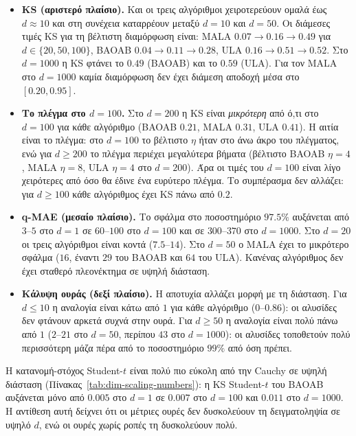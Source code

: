 \begin{itemize}
\item \textbf{KS (αριστερό πλαίσιο).} Και οι τρεις αλγόριθμοι χειροτερεύουν
      ομαλά έως $d \approx 10$ και στη συνέχεια καταρρέουν μεταξύ $d = 10$ και
      $d = 50$. Οι διάμεσες τιμές KS για τη βέλτιστη διαμόρφωση είναι:
      MALA $0.07 \to 0.16 \to 0.49$ για $d \in \{20, 50, 100\}$,
      BAOAB $0.04 \to 0.11 \to 0.28$, ULA $0.16 \to 0.51 \to 0.52$. Στο
      $d=1000$ η KS φτάνει το $0.49$ (BAOAB) και το $0.59$ (ULA). Για τον MALA στο
      $d=1000$ καμία διαμόρφωση δεν έχει διάμεση αποδοχή μέσα στο
      $[0.20, 0.95]$.
\item \textbf{Το πλέγμα στο $d=100$.} Στο $d=200$ η KS είναι \emph{μικρότερη}
      από ό,τι στο $d=100$ για κάθε αλγόριθμο (BAOAB $0.21$, MALA $0.31$, ULA
      $0.41$). Η αιτία είναι το πλέγμα: στο $d=100$ το βέλτιστο $\eta$ ήταν στο
      άνω άκρο του πλέγματος, ενώ για $d \ge 200$ το πλέγμα περιέχει μεγαλύτερα
      βήματα (βέλτιστο BAOAB $\eta=4$, MALA $\eta=8$, ULA $\eta=4$ στο $d=200$).
      Άρα οι τιμές του $d=100$ είναι λίγο χειρότερες από όσο θα έδινε ένα
      ευρύτερο πλέγμα. Το συμπέρασμα δεν αλλάζει: για $d \ge 100$ κάθε
      αλγόριθμος έχει KS πάνω από $0.2$.
\item \textbf{q-MAE (μεσαίο πλαίσιο).} Το σφάλμα στο ποσοστημόριο $97.5\%$
      αυξάνεται από $3$--$5$ στο $d=1$ σε $60$--$100$ στο $d=100$ και σε
      $300$--$370$ στο $d=1000$. Στο $d=20$ οι τρεις αλγόριθμοι είναι κοντά
      ($7.5$--$14$). Στο $d=50$ ο MALA έχει το μικρότερο σφάλμα ($16$, έναντι
      $29$ του BAOAB και $64$ του ULA). Κανένας αλγόριθμος δεν έχει σταθερό
      πλεονέκτημα σε υψηλή διάσταση.
\item \textbf{Κάλυψη ουράς (δεξί πλαίσιο).} Η αποτυχία αλλάζει μορφή με τη
      διάσταση. Για $d \le 10$ η αναλογία είναι κάτω από $1$ για κάθε αλγόριθμο
      ($0$--$0.86$): οι αλυσίδες δεν φτάνουν αρκετά συχνά στην ουρά. Για
      $d \ge 50$ η αναλογία είναι πολύ πάνω από $1$ ($2$--$21$ στο $d=50$,
      περίπου $43$ στο $d=1000$): οι αλυσίδες τοποθετούν πολύ περισσότερη μάζα πέρα
      από το ποσοστημόριο $99\%$ από όση πρέπει.
\end{itemize}

Η κατανομή-στόχος Student-$t$ είναι πολύ πιο εύκολη από την Cauchy σε υψηλή
διάσταση (Πίνακας~\ref{tab:dim-scaling-numbers}): η KS Student-$t$ του BAOAB
αυξάνεται μόνο από $0.005$ στο $d=1$ σε $0.007$ στο $d=100$ και $0.011$ στο
$d=1000$. Η αντίθεση αυτή δείχνει ότι οι μέτριες ουρές δεν δυσκολεύουν τη
δειγματοληψία σε υψηλό $d$, ενώ οι ουρές χωρίς ροπές τη δυσκολεύουν πολύ.


